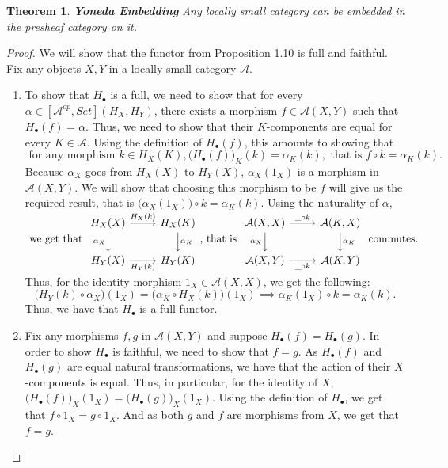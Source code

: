 \documentclass[a4paper]{article}
\newtheorem{theorem}{Theorem}[section]
\theoremstyle{definition}
\begin{document}
			\begin{theorem}{ \textbf{Yoneda Embedding}}
				Any locally small category can be embedded in the presheaf category on it.
			\end{theorem}
			\begin{proof} \setcounter{equation}{0}
				We will show that the functor from Proposition 1.10 is
				full and faithful. Fix any objects $X,Y$ in a locally small category $\mathcal{A}$.
				\begin{enumerate}[label=\Roman*]
					\item To show that $H_\bullet$ is a full, we need to show that for every $\alpha
						\in [\mathcal{A} ^{op},Set](H_X,H_Y)$, there exists a morphism
						$f\in \mathcal{A} (X,Y)$ such that $H_\bullet(f)=\alpha$. Thus, we need
						to show that their $K$-components are equal for every $K \in \mathcal{A}$.
						Using the definition of $H_\bullet(f)$, this amounts to showing that
						\begin{equation}  \text{ for any morphism } k \in H_X(K),
							\Big(H_\bullet(f)\Big)_K^{}(k)=\alpha_K(k), \text{ that is }
							f\circ k=\alpha_K(k).
						\end{equation}
						Because $\alpha_X$ goes from $H_X(X)$ to $H_Y(X)$, $\alpha_X(1_X)$ is a morphism
						in $\mathcal{A}(X,Y)$. We will show that choosing this morphism to be $f$
						will give us the required result, that is $\big( \alpha_X(1_X) \big) \circ
						k=\alpha_K(k)$. Using the naturality of $\alpha$,
						$ \text{ we get that }
							\begin{tikzcd}
								H_X(X) \arrow[swap]{d}{\alpha_X} \arrow{r}{H_X(k)}
			& H_X(K) \arrow{d}{\alpha_K}\\
			H_Y(X) \arrow[swap]{r}{H_Y(k)}
			& H_Y(K)
							\end{tikzcd}
							\text{, that is }
							\begin{tikzcd}
								\mathcal{A} (X,X) \arrow[swap]{d}{\alpha_X} \arrow{r}{\string _ \circ k}
			& \mathcal{A} (K,X) \arrow{d}{\alpha_K}\\
			\mathcal{A} (X,Y) \arrow[swap]{r}{\string _ \circ k}
			& \mathcal{A} (K,Y)
							\end{tikzcd}
						\text{ commutes. }$
						Thus, for the identity morphism $1_X \in \mathcal{A} (X,X)$, we get the following:
						\[ \Big(H_Y(k) \circ \alpha_X\Big)(1_X)=\Big(\alpha_K \circ H_X(k)\Big)(1_X)
							 \implies
						\alpha_K(1_X) \circ k=\alpha_K(k).\]
						Thus, we have that $H_\bullet$ is a full functor.

					\item  Fix any morphisms $f,g$ in $\mathcal{A} (X,Y)$ and suppose
						$H_\bullet(f)=H_\bullet(g)$. In order to show $H_\bullet$ is faithful,
						we need to show that $f=g$. As $H_\bullet(f)$ and $H_\bullet(g)$ are equal natural
						transformations, we have that the action of their $X$-components is equal. Thus,
						in particular, for the identity of $X$, $\big(H_\bullet(f) \big)_X (1_X)
						= \big(H_\bullet(g) \big)_X (1_X)$. Using the definition of $H_\bullet$, we get
						that $f \circ 1_X = g \circ 1_X$. And as both $g$ and $f$ are morphisms
						from $X$, we get that $f=g$.
				\end{enumerate}
			\end{proof}
\end{document}
